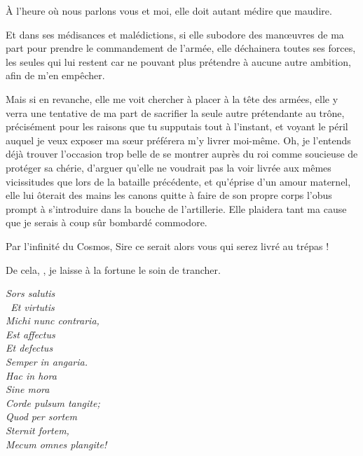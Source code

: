 \begin{drama}
  \alexasspeaks À l’heure où nous parlons vous et moi, elle doit autant médire que maudire.

   \elenaspeaks Et dans ses médisances et malédictions, si elle subodore des manœuvres de ma part pour prendre le commandement de l’armée, elle déchainera toutes ses forces, les seules qui lui restent car ne pouvant plus prétendre à aucune autre ambition, afin de m’en empêcher.

  Mais si en revanche, elle me voit chercher à placer \ela{} à la tête des armées, elle y verra une tentative de ma part de sacrifier la seule autre prétendante au trône, précisément pour les raisons que tu supputais tout à l’instant, et voyant le péril auquel je veux exposer ma sœur préférera m’y livrer moi-même. Oh, je l’entends déjà trouver l’occasion trop belle de se montrer auprès du roi comme soucieuse de protéger sa \princesse{} chérie, d’arguer qu’elle ne voudrait pas la voir livrée aux mêmes vicissitudes que lors de la bataille précédente, et qu’éprise d’un amour maternel, elle lui ôterait des mains les canons quitte à faire de son propre corps l’obus prompt à s’introduire dans la bouche de l’artillerie. Elle plaidera tant ma cause que je serais à coup sûr bombardé commodore.

  \alexasspeaks Par l’infinité du Cosmos, Sire ce serait alors vous qui serez livré au trépas !

  \elenaspeaks  De cela, \alexas, je laisse à la fortune le soin de trancher.

%


  \choirspeaks
  \begin{minipage}[t]{\linewidth}
    \em
    Sors salutis\endnote{\carminaendnote}\\\
    Et virtutis\\
    Michi nunc contraria,\\
    Est affectus\\
    Et defectus\\
    Semper in angaria.\\
    Hac in hora\\
    Sine mora\\
    Corde pulsum tangite;\\
    Quod per sortem\\
    Sternit fortem,\\
    Mecum omnes plangite!
  \end{minipage}



\end{drama}

